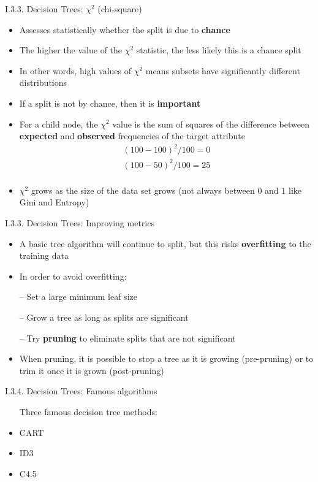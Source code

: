 \documentclass[handout]{beamer}
\newcommand{\strong}[1]{\textbf{\color{teal} #1}}
\newcommand{\stronger}[1]{\textbf{\color{purple} #1}}
\begin{document}
\begin{frame}{I.3.3. Decision Trees: $\chi^2$ (chi-square)}
\begin{itemize}
\item Assesses statistically whether the split is due to \strong{chance}
\item The higher the value of the $\chi^2$ statistic, the less likely this is a chance split
\item In other words, high values of $\chi^2$ means subsets have significantly different distributions
\item If a split is not by chance, then it is \strong{important}
\item For a child node, the $\chi^2$ value is the sum of squares of the difference between \strong{expected} and \strong{observed} frequencies of the target attribute
\[
\begin{array}{l}
	( 100 - 100 )^2 / 100 = 0 \\
	( 100 - 50 )^2 / 100 = 25 \\
\end{array}
\]
\item $\chi^2$ grows as the size of the data set grows (not always between $0$ and $1$ like Gini and Entropy)
\end{itemize}
\end{frame}
\begin{frame}{I.3.3. Decision Trees: Improving metrics}
\begin{itemize}
\item A basic tree algorithm will continue to split, but this risks \strong{overfitting} to the training data
\item In order to avoid overfitting:
\item[--] Set a large minimum leaf size
\item[--] Grow a tree as long as splits are significant
\item[--] Try \stronger{pruning} to eliminate splits that are not significant
\item When pruning, it is possible to stop a tree as it is growing (pre-pruning) or to trim it once it is grown (post-pruning)
\end{itemize}
\end{frame}
\begin{frame}{I.3.4. Decision Trees: Famous algorithms}
\begin{itemize}
\item[] Three famous decision tree methods:
\item[]
\item CART
\item[]
\item ID3
\item[]
\item C4.5
\end{itemize}
\end{frame}
\end{document}
